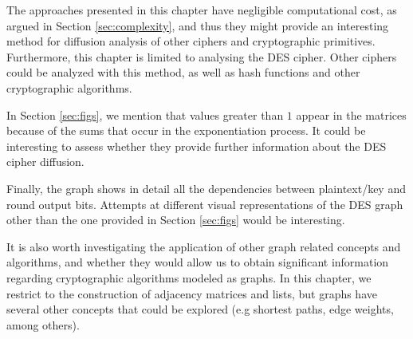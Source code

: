 \documentclass{report}
\begin{document}
The approaches presented in this chapter have negligible computational cost, as argued in Section \ref{sec:complexity}, and thus they might provide an interesting method for diffusion analysis of other ciphers and cryptographic primitives. Furthermore, this chapter is limited to analysing the DES cipher. Other ciphers could be analyzed with this method, as well as hash functions and other cryptographic algorithms.

In Section \ref{sec:figs}, we mention that values greater than $1$ appear in the matrices because of the sums that occur in the exponentiation process. It could be interesting to assess whether they provide further information about the DES cipher diffusion.

Finally, the graph shows in detail all the dependencies between plaintext/key and round output bits. Attempts at different visual representations of the DES graph other than the one provided in Section \ref{sec:figs} would be interesting.

It is also worth investigating the application of other graph related concepts and algorithms, and whether they would allow us to obtain significant information regarding cryptographic algorithms modeled as graphs. In this chapter, we restrict to the construction of adjacency matrices and lists, but graphs have several other concepts that could be explored (e.g shortest paths, edge weights, among others).



\end{document}
